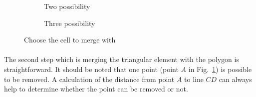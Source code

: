 \begin{figure}[!ht]    
    \begin{subfigure}[b]{0.5\linewidth}
        \centering
        \caption{Two possibility}
    \end{subfigure}
    \begin{subfigure}[b]{0.5\linewidth}
        \centering
        \caption{Three possibility}
        \label{adap_fig:mt_choose_3p}
    \end{subfigure}    
    \caption[Choose the cell to merge with]{Choose the cell to merge with}
    \label{adap_fig:mt_choose}
\end{figure}

\paragraph{}
The second step which is merging the triangular element with the polygon is straightforward.
It should be noted that one point (point $A$ in Fig.~\ref{adap_fig:mt_choose_3p}) is possible to be removed.
A calculation of the distance from point $A$ to line $CD$ can always help to determine whether the point can be removed or not.

